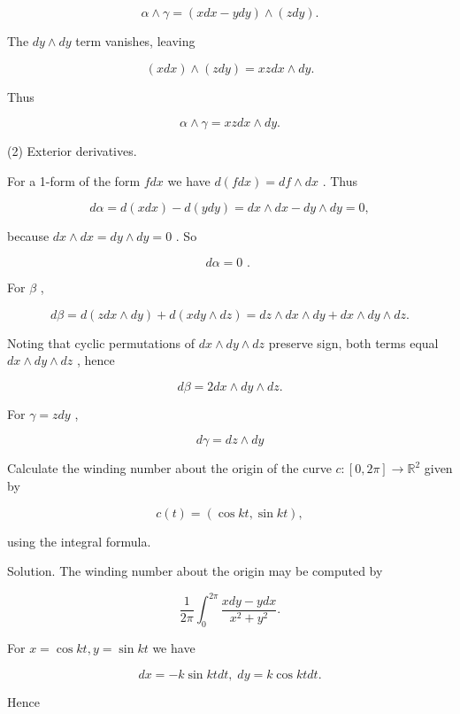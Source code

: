 \documentclass[10pt]{article}
\begin{document}
\[
\alpha  \land  \gamma  = \left( {{xdx} - {ydy}}\right)  \land  \left( {zdy}\right) .
\]

The \({dy} \land  {dy}\) term vanishes, leaving

\[
\left( {xdx}\right)  \land  \left( {zdy}\right)  = {xzdx} \land  {dy}.
\]

Thus

\[
\alpha  \land  \gamma  = {xzdx} \land  {dy}.
\]

(2) Exterior derivatives.

For a 1-form of the form \({fdx}\) we have \(d\left( {fdx}\right)  = {df} \land  {dx}\) . Thus

\[
{d\alpha } = d\left( {xdx}\right)  - d\left( {ydy}\right)  = {dx} \land  {dx} - {dy} \land  {dy} = 0,
\]

because \({dx} \land  {dx} = {dy} \land  {dy} = 0\) . So

\[
{d\alpha } = 0\text{ . }
\]

For \(\beta\) ,

\[
{d\beta } = d\left( {{zdx} \land  {dy}}\right)  + d\left( {{xdy} \land  {dz}}\right)  = {dz} \land  {dx} \land  {dy} + {dx} \land  {dy} \land  {dz}.
\]

Noting that cyclic permutations of \({dx} \land  {dy} \land  {dz}\) preserve sign, both terms equal \({dx} \land  {dy} \land  {dz}\) , hence

\[
{d\beta } = {2dx} \land  {dy} \land  {dz}.
\]

For \(\gamma  = {zdy}\) ,

\[
{d\gamma } = {dz} \land  {dy}
\]

\begin{problem}[title=PROBLEM 2 (4 POINTS)]
Calculate the winding number about the origin of the curve \(c : \left\lbrack  {0,{2\pi }}\right\rbrack   \rightarrow  {\mathbb{R}}^{2}\) given by

\[
c\left( t\right)  = \left( {\cos {kt},\sin {kt}}\right) ,
\]

using the integral formula.
\end{problem}

Solution. The winding number about the origin may be computed by

\[
\frac{1}{2\pi }{\int }_{0}^{2\pi }\frac{{xdy} - {ydx}}{{x}^{2} + {y}^{2}}.
\]

For \(x = \cos {kt},y = \sin {kt}\) we have

\[
{dx} =  - k\sin {ktdt},\;{dy} = k\cos {ktdt}.
\]

Hence
\end{document}
